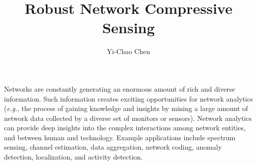 \documentclass[12pt]{report}  %
\author{Yi-Chao Chen}   %
\title{Robust Network Compressive Sensing}
\theoremstyle{plain} %
\theoremstyle{definition}
\theoremstyle{remark}
\numberwithin{equation}{section}
\newcommand{\eg}{{\em e.g.}\xspace}
\begin{document}
\copyrightpage          %


%
%
%
\commcertpage           %

\titlepage              %



%







\utabstract
{}
\indent

Networks are constantly generating an enormous amount of rich and diverse information. Such information creates exciting opportunities for network analytics (\eg, the process of gaining knowledge and insights by mining a large amount of network data collected by a diverse set of monitors or sensors). Network analytics can provide deep insights into the complex interactions among network entities, and between human and technology. Example applications include spectrum sensing, channel estimation, data aggregation, network coding, anomaly detection, localization, and activity detection.
\end{document}
